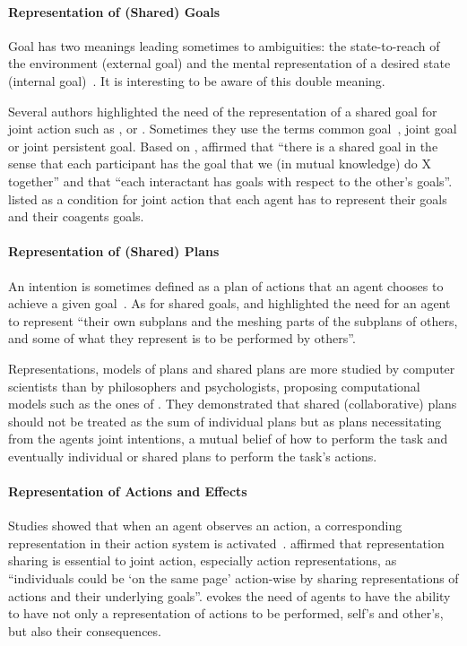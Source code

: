 \documentclass[a4paper,11pt,twoside]{StyleThese}
\begin{document}
\paragraph{Representation of (Shared) Goals}
Goal has two meanings leading sometimes to ambiguities: the state-to-reach of the environment (external goal) and the mental representation of a desired state (internal goal)~\citep{tomasello_2005_understanding}. It is interesting to be aware of this double meaning. 

Several authors highlighted the need of the representation of a shared goal for joint action such as \cite{pacherie_2012_agency}, \cite{tomasello_2005_understanding} or \cite{cohen_1991_teamwork}. Sometimes they use the terms  common goal~\citep{searle_1990_collective}, joint goal or joint persistent goal.
Based on \cite{bratman_1992_coop}, \citet[p.~680]{tomasello_2005_understanding} affirmed that ``there is a shared goal in the sense that each participant has the goal that we (in mutual knowledge) do X together'' and that ``each interactant has goals with respect to the other’s goals''. \cite{pacherie_2012_agency} listed as a condition for joint action that each agent has to represent their goals and their coagents goals.

\paragraph{Representation of (Shared) Plans}
An intention is sometimes defined as a plan of actions that an agent chooses to achieve a given goal~\citep{tomasello_2005_understanding, kaplan_2006_challenges}. 
As for shared goals, \cite{tomasello_2005_understanding} and \citet[p.~353]{pacherie_2012_agency} highlighted the need for an agent to represent ``their own subplans and the meshing parts of the subplans of others, and some of what they represent is to be performed by others''.

Representations, models of plans and shared plans are more studied by computer scientists than by philosophers and psychologists, proposing computational models such as the ones of \cite{grosz_1996_collaborative}. They demonstrated that shared (collaborative) plans should not be treated as the sum of individual plans but as plans necessitating from the agents joint intentions, a mutual belief of how to perform the task and eventually individual or shared plans to perform the task's actions.

\paragraph{Representation of Actions and Effects}
Studies showed that when an agent observes an action, a corresponding representation in their action system is activated~\citep{rizzolatti_2004_mirror}. \citet[p.~71]{sebanz_2006_joint} affirmed that representation sharing is essential to joint action, especially action representations, as ``individuals could be ‘on the same page’ action-wise by sharing representations of actions and their underlying goals''. \cite{pacherie_2012_agency} evokes the need of agents to have the ability to have not only a representation of actions to be performed, self's and other's, but also their consequences. 
\end{document}
